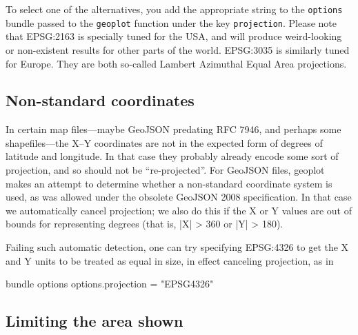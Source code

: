 \documentclass{article}
\begin{document}
To select one of the alternatives, you add the appropriate string to
the \texttt{options} bundle passed to the \texttt{geoplot} function
under the key \texttt{projection}. Please note that \textsf{EPSG:2163}
is specially tuned for the USA, and will produce weird-looking or
non-existent results for other parts of the world. \textsf{EPSG:3035}
is similarly tuned for Europe. They are both so-called Lambert
Azimuthal Equal Area projections.

\subsection*{Non-standard coordinates}

In certain map files---maybe GeoJSON predating RFC 7946, and perhaps
some shapefiles---the X--Y coordinates are not in the expected form of
degrees of latitude and longitude. In that case they probably already
encode some sort of projection, and so should not be ``re-projected''.
For GeoJSON files, \textsf{geoplot} makes an attempt to determine
whether a non-standard coordinate system is used, as was allowed under
the obsolete GeoJSON 2008 specification. In that case we automatically
cancel projection; we also do this if the X or Y values are out of
bounds for representing degrees (that is, |X| > 360 or |Y| > 180).

Failing such automatic detection, one can try specifying
\textsf{EPSG:4326} to get the X and Y units to be treated as equal in
size, in effect canceling projection, as in
\begin{code}
bundle options
options.projection = "EPSG4326"
\end{code}

\subsection*{Limiting the area shown}
\label{sec:xyranges}
\end{document}
